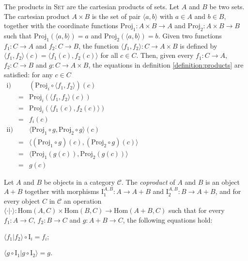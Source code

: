 The products in \textsc{Set} are the cartesian products of sets. Let $ A $ and $ B $ be two sets. The cartesian product $ A \times B $ is the set of pair $ \langle a, b \rangle $ with $ a \in A $ and $ b \in B $, together with the coordinate functions $ \text{Proj}_1 : A \times B \to A $ and $ \text{Proj}_2 : A \times B \to B $ such that $ \text{Proj}_1 ( \langle a, b \rangle ) = a $ and $ \text{Proj}_2 ( \langle a, b \rangle ) = b $. Given two functions $ f_1 : C \to A $ and $ f_2 : C \to B $, the function $ \langle f_1 , f_2 \rangle : C \to A \times B $ is defined by $ \langle f_1 , f_2 \rangle (c) = \langle f_1 (c) , f_2 (c) \rangle $ for all $ c \in C $. Then, given every $ f_1 : C \to A $, $ f_2 : C \to B $ and $ g : C \to A \times B $, the equations in definition \ref{definition:products} are satisfied: for any $ c \in C $\\
$
\begin{array}{rll}
\text{i)} & & ( \text{Proj}_i \circ \langle f_1 , f_2 \rangle )(c)\\
 & = & \text{Proj}_i ( \langle f_1 , f_2 \rangle (c) )\\
 & = & \text{Proj}_i ( \langle f_1 (c) , f_2 (c) \rangle )\\
 & = & f_i (c) \\
\text{ii)} & & \langle \text{Proj}_1 \circ g , \text{Proj}_2 \circ g \rangle (c)\\
 & = & \langle ( \text{Proj}_1 \circ g )(c) , ( \text{Proj}_2 \circ g )(c) \rangle \\
 & = & \langle \text{Proj}_1 ( g(c) ) , \text{Proj}_2 ( g(c) ) \rangle \\
 & = & g(c)
\end{array}
$\\
\mbox\\

\begin{definition}
\label{definition:coproducts}
Let $ A $ and $ B $ be objects in a category $ \mathcal{C} $. The \emph{coproduct} of $ A $ and $ B $ is an object $ A+B $ together with morphisms $ \text{I}_1^{A,B} : A \to A + B $ and $ \text{I}_2^{A,B} : B \to A + B $, and for every object $ C $ in $ \mathcal{C} $ an operation $ \langle \cdot | \cdot \rangle : \text{Hom}(A,C) \times \text{Hom}(B,C) \to \text{Hom}(A+B,C) $ such that for every $ f_1 : A \to C $, $ f_2 : B \to C $ and $ g : A+B \to C $, the following equations hold:
\begin{myitemize}
\item $ \langle f_1 | f_2 \rangle \circ \text{I}_i = f_i $;
\item $ \langle g \circ \text{I}_1 | g \circ \text{I}_2 \rangle = g $.
\end{myitemize}
\end{definition}

